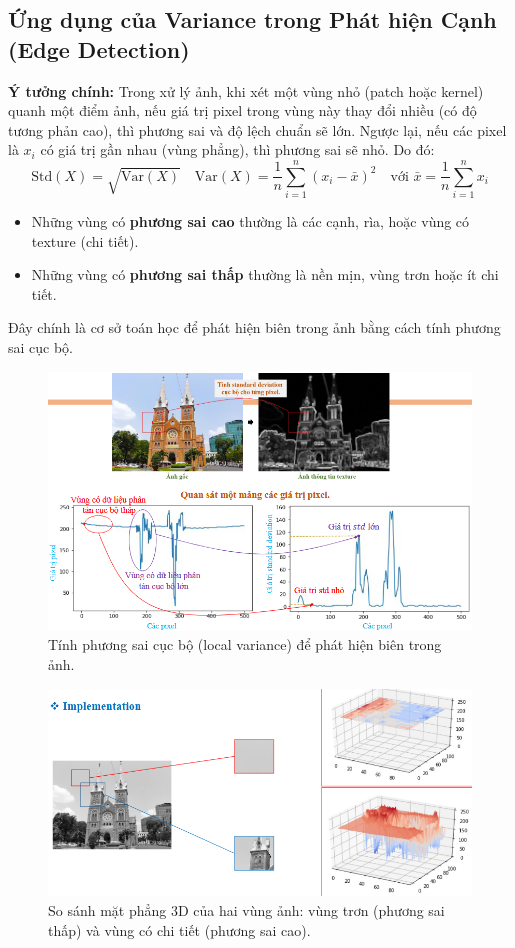 \documentclass[11pt]{article}
\begin{document}
\subsection{Ứng dụng của Variance trong Phát hiện Cạnh (Edge Detection)}
\textbf{Ý tưởng chính:} Trong xử lý ảnh, khi xét một vùng nhỏ (patch hoặc kernel) quanh một điểm ảnh, nếu giá trị pixel trong vùng này thay đổi nhiều (có độ tương phản cao), thì phương sai và độ lệch chuẩn sẽ lớn. Ngược lại, nếu các pixel là $x_i$ có giá trị gần nhau (vùng phẳng), thì phương sai sẽ nhỏ. Do đó:
\[
\text{Std}(X) = \sqrt{\text{Var}(X)} 
\quad \text{Var}(X) = \frac{1}{n} \sum_{i=1}^{n} (x_i - \bar{x})^2
\quad \text{với } \bar{x} = \frac{1}{n} \sum_{i=1}^{n} x_i
\]

\begin{itemize}
\item Những vùng có \textbf{phương sai cao} thường là các cạnh, rìa, hoặc vùng có texture (chi tiết).
\item Những vùng có \textbf{phương sai thấp} thường là nền mịn, vùng trơn hoặc ít chi tiết.
\end{itemize}
Đây chính là cơ sở toán học để phát hiện biên trong ảnh bằng cách tính phương sai cục bộ.


\begin{figure}[H]
    \centering
    \includegraphics[width=0.85\linewidth]{images/variance_edge_detect.png} %
    \caption{Tính phương sai cục bộ (local variance) để phát hiện biên trong ảnh.}
\end{figure}

\begin{figure}[H]
    \centering
    \includegraphics[width=0.8\linewidth]{images/variance_edge_detect3d.png} %
    \caption{So sánh mặt phẳng 3D của hai vùng ảnh: vùng trơn (phương sai thấp) và vùng có chi tiết (phương sai cao).}
\end{figure}
\end{document}
